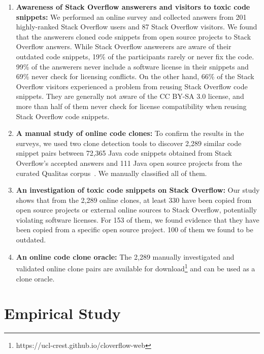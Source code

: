 \documentclass[10pt,journal,compsoc]{IEEEtran}
\begin{document}
\begin{enumerate} 
	
	\item \textbf{Awareness of Stack Overflow answerers and visitors to toxic code
	snippets:} We performed an online survey and collected answers from 201
highly-ranked Stack Overflow users and 87 Stack Overflow visitors. 
We found that the answerers cloned code snippets
from open source projects to Stack Overflow answers. While Stack Overflow
answerers are aware of their outdated code snippets, 19\% of the participants
rarely or never fix the code. 99\% of the answerers never include a software
license in their snippets and 69\% never check for licensing conflicts.
On the other hand, 66\% of the
Stack Overflow visitors experienced a problem from reusing Stack Overflow code snippets. 
They are generally not aware of the CC BY-SA 3.0 license, and more than
half of them never check for license compatibility when reusing Stack Overflow
code snippets.
	
	\item \textbf{A manual study of online code clones:} 
	To confirm the results in the surveys, we used
	two clone detection tools to discover 2,289 similar code snippet pairs between
	72,365 Java code snippets obtained from Stack Overflow's accepted answers and
	111 Java open source projects from the curated Qualitas
	corpus~\cite{QualitasCorpus}. We manually
	classified all of them.
	
	\item \textbf{An investigation of toxic code snippets on Stack Overflow:} Our study shows that from
	the 2,289 online clones, at least 330 have been copied from open source
	projects or external online sources to Stack Overflow, potentially violating
	software licenses. For 153 of them, we found evidence that they have been copied
	from a specific open source project. 100 of them we found to be outdated. %
	
	\item \textbf{An online code
		clone oracle:} The 2,289 manually investigated and validated online clone pairs
	are available for download\footnote{https://ucl-crest.github.io/cloverflow-web} and
	can be used as a clone oracle. \end{enumerate}

\section{Empirical Study}
\end{document}

